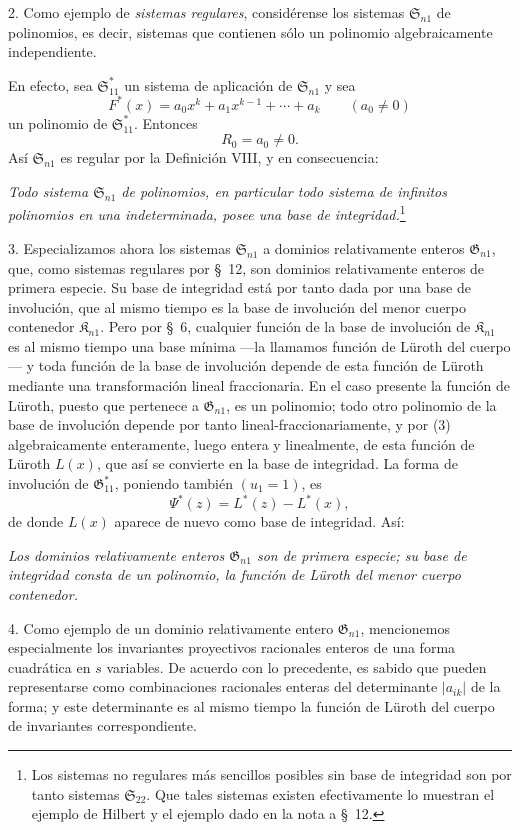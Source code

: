 \documentclass[11pt]{article}
\providecommand{\Kfield}{\mathfrak{K}}
\providecommand{\Ssys}{\mathfrak{S}}
\providecommand{\Gdom}{\mathfrak{G}}
\begin{document}
2. Como ejemplo de \emph{sistemas regulares}, considérense los sistemas $\Ssys_{n1}$ de polinomios, es decir, sistemas que contienen sólo un polinomio algebraicamente independiente.

En efecto, sea $\Ssys^*_{11}$ un sistema de aplicación de $\Ssys_{n1}$ y sea
\[
  F^*(x)=a_0x^k+a_1x^{k-1}+\cdots+a_k\qquad(a_0\ne0)
\]
un polinomio de $\Ssys^*_{11}$. Entonces
\begin{equation}
  R_0=a_0\ne0.
\tag{3}
\end{equation}
Así $\Ssys_{n1}$ es regular por la Definición VIII, y en consecuencia:

\emph{Todo sistema $\Ssys_{n1}$ de polinomios, en particular todo sistema de infinitos polinomios en una indeterminada, posee una base de integridad.}\footnote{Los sistemas no regulares más sencillos posibles sin base de integridad son por tanto sistemas $\Ssys_{22}$. Que tales sistemas existen efectivamente lo muestran el ejemplo de Hilbert y el ejemplo dado en la nota a \S\ 12.}

3. Especializamos ahora los sistemas $\Ssys_{n1}$ a dominios relativamente enteros $\Gdom_{n1}$, que, como sistemas regulares por \S\ 12, son dominios relativamente enteros de primera especie. Su base de integridad está por tanto dada por una base de involución, que al mismo tiempo es la base de involución del menor cuerpo contenedor $\Kfield_{n1}$. Pero por \S\ 6, cualquier función de la base de involución de $\Kfield_{n1}$ es al mismo tiempo una base mínima ---la llamamos función de Lüroth del cuerpo--- y toda función de la base de involución depende de esta función de Lüroth mediante una transformación lineal fraccionaria. En el caso presente la función de Lüroth, puesto que pertenece a $\Gdom_{n1}$, es un polinomio; todo otro polinomio de la base de involución depende por tanto lineal-fraccionariamente, y por (3) algebraicamente enteramente, luego entera y linealmente, de esta función de Lüroth $L(x)$, que así se convierte en la base de integridad. La forma de involución de $\Gdom^*_{11}$, poniendo también $(u_1=1)$, es
\[
  \Psi^*(z)=L^*(z)-L^*(x),
\]
de donde $L(x)$ aparece de nuevo como base de integridad. Así:

\emph{Los dominios relativamente enteros $\Gdom_{n1}$ son de primera especie; su base de integridad consta de un polinomio, la función de Lüroth del menor cuerpo contenedor.}

4. Como ejemplo de un dominio relativamente entero $\Gdom_{n1}$, mencionemos especialmente los invariantes proyectivos racionales enteros de una forma cuadrática en $s$ variables. De acuerdo con lo precedente, es sabido que pueden representarse como combinaciones racionales enteras del determinante $|a_{ik}|$ de la forma; y este determinante es al mismo tiempo la función de Lüroth del cuerpo de invariantes correspondiente.
\end{document}
